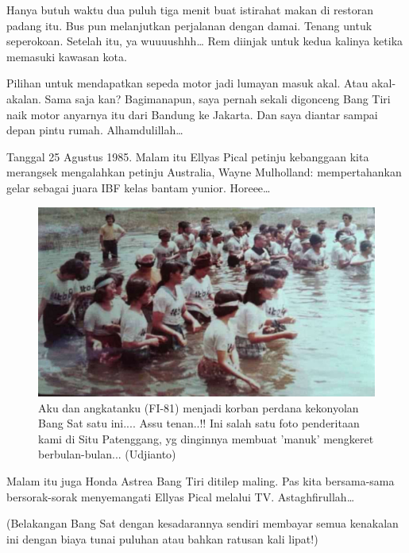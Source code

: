 Hanya butuh waktu dua puluh tiga menit buat istirahat makan di restoran padang itu. Bus pun melanjutkan perjalanan dengan damai. Tenang untuk seperokoan. Setelah itu, ya wuuuushhh… Rem diinjak untuk kedua kalinya ketika memasuki kawasan kota.

Pilihan untuk mendapatkan sepeda motor jadi lumayan masuk akal. Atau akal-akalan. Sama saja kan? Bagimanapun, saya pernah sekali digonceng Bang Tiri naik motor anyarnya itu dari Bandung ke Jakarta. Dan saya diantar sampai depan pintu rumah. Alhamdulillah…

Tanggal 25 Agustus 1985. Malam itu Ellyas Pical petinju kebanggaan kita merangsek mengalahkan petinju Australia, Wayne Mulholland: mempertahankan gelar sebagai juara IBF kelas bantam yunior. Horeee…

\begin{figure}[htbp]
\centerline{\includegraphics[scale=1.0]{01-10-02}}
\caption{Aku dan angkatanku (FI-81) menjadi korban perdana kekonyolan Bang Sat satu ini.... Assu tenan..!!
Ini salah satu foto penderitaan kami di Situ Patenggang, 
yg dinginnya membuat 'manuk' mengkeret berbulan-bulan... (Udjianto)}
\label{01-10-02}
\end{figure}
%

Malam itu juga Honda Astrea Bang Tiri ditilep maling. Pas kita bersama-sama bersorak-sorak menyemangati Ellyas Pical melalui TV. Astaghfirullah…

(Belakangan Bang Sat dengan kesadarannya sendiri membayar semua kenakalan ini dengan biaya tunai puluhan atau bahkan ratusan kali lipat!)

